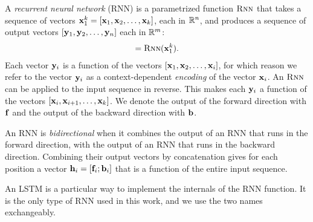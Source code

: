     \begin{definition}{} A \textit{recurrent neural network} (RNN) is a parametrized function $\textsc{Rnn}$ that takes a sequence of vectors $\mathbf{x}_1^k = [ \mathbf{x}_1, \mathbf{x}_2, \dots, \mathbf{x}_k ]$, each in $\mathbb{R}^{n}$, and produces a sequence of output vectors $[\mathbf{y}_1, \mathbf{y}_2, \dots,\mathbf{y}_n]$ each in $\mathbb{R}^{m}$:
    \begin{align*}
      [\vecy_1, \vecy_2, \dots, \vecy_k] = \rnn( \mathbf{x}_1^k ).
    \end{align*}
    Each vector $\mathbf{y}_i$ is a function of the vectors $[\mathbf{x}_1, \mathbf{x}_2, \dots, \mathbf{x}_i ]$, for which reason we refer to the vector $\mathbf{y}_i$ as a context-dependent \textit{encoding} of the vector $\mathbf{x}_i$. An $\textsc{Rnn}$ can be applied to the input sequence in reverse. This makes each $\mathbf{y}_i$ a function of the vectors $[\mathbf{x}_i, \mathbf{x}_{i+1}, \dots, \mathbf{x}_k ]$. We denote the output of the forward direction with $\mathbf{f}$ and the output of the backward direction with $\mathbf{b}$.
    \end{definition}

    \begin{definition}{} An RNN is \textit{bidirectional} when it combines the output of an RNN that runs in the forward direction, with the output of an RNN that  runs in the backward direction. Combining their output vectors by concatenation gives for each position a vector $\mathbf{h}_i = [ \mathbf{f}_i; \mathbf{b}_i ]$ that is a function of the entire input sequence.
    \end{definition}

    \begin{definition}{} An LSTM \citep{hochreiter1997long} is a particular way to implement the internals of the RNN function. It is the only type of RNN used in this work, and we use the two names exchangeably.
    \end{definition}

